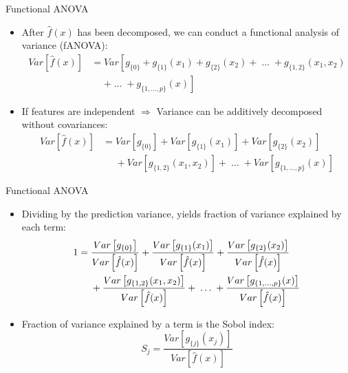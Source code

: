 \documentclass[11pt,compress,t,notes=noshow, aspectratio=169, xcolor=table]{beamer}
\newcommand{\open}{\{}
\newcommand{\close}{\}}
\begin{document}
\begin{frame}{Functional ANOVA}

\begin{itemize}
\item After $\hat{f}(x)$ has been decomposed, we can conduct a functional analysis of variance (fANOVA):
\begin{align*}
Var\left[\hat{f}(x)\right] &= Var\left[g_{\open  0  \close} + g_{\open 1 \close}(x_1) + g_{\open 2 \close}(x_2) + \;\dots\; + g_{\open 1, 2 \close}(x_1, x_2) \right. \\
&\phantom{{}={}} \left. + \;\dots\; + g_{\open 1,\ldots,p \close}(x) \right]
\end{align*}
\item If features are independent $\Rightarrow$ Variance can be additively decomposed without covariances:
\begin{align*}
Var\left[\hat{f}(x)\right] &= Var\left[g_{\open  0  \close}\right] + Var\left[g_{\open 1 \close}(x_1)\right] + Var\left[g_{\open 2 \close}(x_2)\right] \\
&\phantom{{}={}} + Var\left[g_{\open 1, 2 \close}(x_1, x_2)\right] + \;\dots\; + Var\left[g_{\open 1,\ldots,p \close}(x)\right]
\end{align*}
\end{itemize}
\end{frame}

\begin{frame}{Functional ANOVA}

\begin{itemize}
\item Dividing by the prediction variance, yields fraction of variance explained by each term:
\begin{align*}
1 &= \frac{Var\left[g_{\open  0  \close}\right]}{\predvar} + \frac{Var\left[g_{\open 1 \close}(x_1)\right]}{\predvar} + \frac{Var\left[g_{\open 2 \close}(x_2)\right]}{\predvar} \\
&\phantom{{}={}} + \frac{Var\left[g_{\open 1, 2 \close}(x_1, x_2)\right]}{\predvar} + \;\dots\; + \frac{Var\left[g_{\open 1,\ldots,p \close}(x)\right]}{\predvar}
\end{align*}

\item Fraction of variance explained by a term is the Sobol index:
$$
S_j = \frac{Var\left[g_{\open j \close}(x_j)\right]}{Var\left[\hat{f}(x)\right]}
$$
\end{itemize}

\end{frame}


\endlecture
\end{document}
